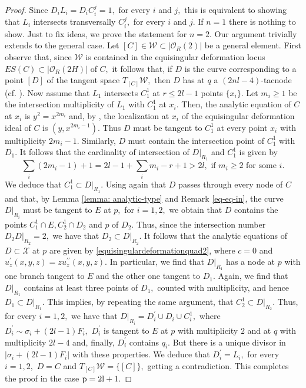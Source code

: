 \documentclass[plain]{amsart}
\def\p{\rm{p}}
\begin{document}
\begin{proof}
Since $D_iL_i=D_iC_i^j=1,$ for every $i$ and $j,$ this is equivalent to showing that 
 $L_i$ intersects transversally $C_i^j,$ for every $i$ and $j.$ If $n=1$ there is nothing to show.
Just to fix ideas, we prove the statement for $n=2.$ Our argument trivially extends to the general case.
Let $[C]\in \mathcal W\subset |\mathcal O_R(2)|$ be a general element.
First observe that, since $\mathcal W$ is contained in the equisingular deformation 
locus $ES(C)\subset |\mathcal O_R(2H)|$ of $C,$  
it follows that, if $D$ is the curve corresponding to a point $[D]$ of the tangent
space $T_{[C]}\mathcal W,$ then $D$ has at $q$ a $(2nl-4)$-tacnode 
(cf. \cite[Proof of Theorem 3.3]{galati-knutsen}). Now assume that $L_1$ intersects
$C_1^1$ at $r\leq 2l-1$ points $\{x_i\}.$ Let $m_i\geq 1$ be the intersection multiplicity of $L_1$ with $C_1^1$ at $x_i.$ 
Then, the analytic equation of $C$ at $x_i$ is $y^2=x^{2m_i}$
and, by \cite[Proposition (5.6)]{diaz_harris}, the localization at $x_i$ of the equisingular deformation ideal of $C$ is $(y,x^{2m_i-1}).$
Thus $D$ must be tangent to $C^1_1$ at every point $x_i$ with multiplicity $2m_i-1.$
Similarly, $D$ must contain the intersection point of $C_1^1$ with $D_1.$ It follows that the cardinality
of intersection of $D|_{R_1}$ and $C_1^1$ is given by
$$
\sum_i(2m_i-1)+1=2l-1+\sum_im_i-r+1>2l,\,\,\mbox{if}\,\,m_i\geq 2\,\,\mbox{for some}\,\, i.
$$
We deduce that $C_1^1\subset D|_{R_1}.$ Using again that $D$ passes through every node
of $C$ and that, by Lemma \ref{lemma: analytic-type} and Remark \ref{eq-eq-in}, 
the curve $D|_{R_i}$ must be tangent to $E$ at $p,$ for $i=1,2,$ we obtain that $D$ contains the points 
$C_1^1\cap E, C_2^1\cap D_2$ and $p$ of $D_2.$ Thus, since the intersection number $D_2D|_{R_2}=2,$ 
we have that $D_2\subset D|_{R_2}.$  It follows that the analytic equations of $D\subset \mathcal X$ at $p$
are given by \eqref{equisingulardeformationquad2}, where $c=0$ and $u^\prime_z(x,y,z)=zu_z^{\prime\prime}(x,y,z).$ 
In particular, we find that $D|_{R_1}$ has a node at $p$ with one branch tangent to $E$
and the other one tangent to $D_1.$ Again, we find that $D|_{R_1}$ contains at least three points of $D_1,$
counted with multiplicity, and hence $D_1\subset D|_{R_1}.$ This implies, by repeating the same argument,
that $C_2^1\subset D|_{R_2}.$ Thus, for every $i=1,2,$ we have that $D|_{R_i}=D_i^\prime\cup D_i\cup C_i^1,$
where $D_i^\prime\sim \sigma_i+(2l-1)F_i,$ $D_i^\prime$ is tangent to $E$ at $p$ with multiplicity $2$ and at $q$ with multiplicity $2l-4$ and, finally, $D_i^\prime$ contains $q_i.$ 
But there is a unique divisor in $|\sigma_i+(2l-1)F_i|$ with these properties. We deduce that $D_i^\prime=L_i,$
for every $i=1,2,$ $D=C$
and $T_{[C]}\mathcal W=\{[C]\},$ getting a contradiction. This completes the proof
in the case $\p=2l+1$.



\end{proof}
\end{document}
